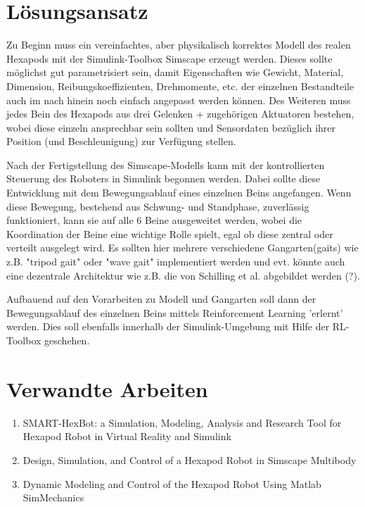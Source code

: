 \section{Lösungsansatz}
Zu Beginn muss ein vereinfachtes, aber physikalisch korrektes Modell des realen Hexapods mit der Simulink-Toolbox Simscape erzeugt werden.
Dieses sollte möglichst gut parametrisiert sein, damit Eigenschaften wie Gewicht, Material, Dimension, Reibungskoeffizienten, Drehmomente, etc. der einzelnen Bestandteile auch im nach hinein noch einfach angepasst werden können.
Des Weiteren muss jedes Bein des Hexapods aus drei Gelenken + zugehörigen Aktuatoren bestehen, wobei diese einzeln ansprechbar sein sollten und Sensordaten bezüglich ihrer Position (und Beschleunigung) zur Verfügung stellen.

Nach der Fertigstellung des Simscape-Modells kann mit der kontrollierten Steuerung des Roboters in Simulink begonnen werden.
Dabei sollte diese Entwicklung mit dem Bewegungsablauf eines einzelnen Beins angefangen.
Wenn diese Bewegung, bestehend aus Schwung- und Standphase, zuverlässig funktioniert, kann sie auf alle 6 Beine ausgeweitet werden, wobei die Koordination der Beine eine wichtige Rolle spielt, egal ob diese zentral oder verteilt ausgelegt wird.
Es sollten hier mehrere verschiedene Gangarten(gaits) wie z.B. "tripod gait" oder "wave gait" implementiert werden und evt. könnte auch eine dezentrale Architektur wie z.B. die von Schilling et al. abgebildet werden (?).

Aufbauend auf den Vorarbeiten zu Modell und Gangarten soll dann der Bewegungsablauf des einzelnen Beins mittels Reinforcement Learning 'erlernt' werden. Dies soll ebenfalls innerhalb der Simulink-Umgebung mit Hilfe der RL-Toolbox geschehen.





\section{Verwandte Arbeiten}
\begin{enumerate}
\item SMART-HexBot: a Simulation, Modeling, Analysis and
Research Tool for Hexapod Robot in Virtual Reality and
Simulink

\item Design, Simulation, and Control of a Hexapod Robot in
Simscape Multibody

\item Dynamic Modeling and Control of the Hexapod Robot Using Matlab SimMechanics

\end{enumerate}


